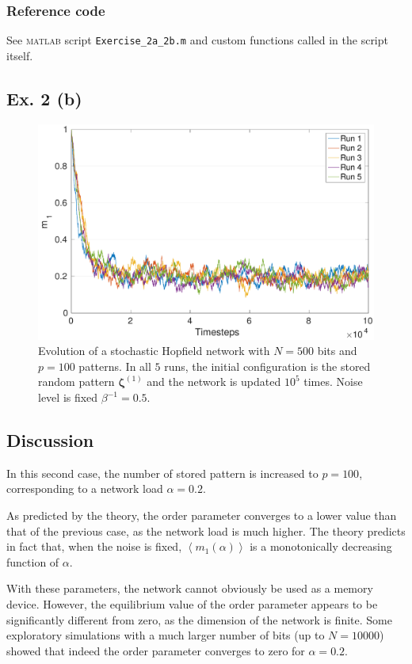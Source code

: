 \documentclass[12pt,A4,titlepage]{article}
\begin{document}
\subsubsection*{Reference code}
See \textsc{matlab} script \verb!Exercise_2a_2b.m! and custom functions called in the script itself.
\clearpage

\subsection*{Ex. 2 (b)}

\begin{figure}[H]
\centering
\includegraphics[width=\textwidth]{figures/fig_2b.pdf}
\caption{Evolution of a stochastic Hopfield network with $N = 500$ bits and $p = 100$ patterns. In all $5$ runs, the initial configuration is the stored random pattern $\bm{\zeta}^{(1)}$ and the network is updated $10^5$ times. Noise level is fixed $\beta^{-1} = 0.5$.}
\label{2b}
\end{figure}

\subsection*{Discussion}
In this second case, the number of stored pattern is increased to $p = 100 $, corresponding to a network load $ \alpha = 0.2 $. 

As predicted by the theory, the order parameter converges to a lower value than that of the previous case, as the network load is much higher. The theory predicts in fact that, when the noise is fixed, $\left<m_1(\alpha)\right>$ is a monotonically decreasing function of $\alpha$. 

With these parameters, the network cannot obviously be used as a memory device. However, the equilibrium value of the order parameter appears to be significantly different from zero, as the dimension of the network is finite. Some exploratory simulations with a much larger number of bits (up to $N = 10000$) showed that indeed the order parameter converges to zero for $ \alpha = 0.2 $.
\end{document}
